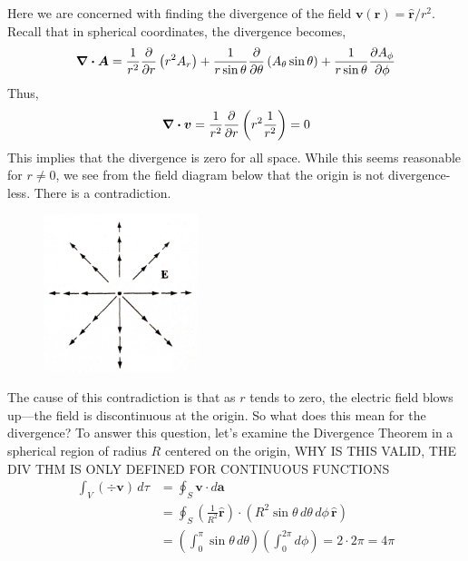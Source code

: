 \documentclass[12pt]{report}
\numberwithin{equation}{section}
\begin{document}
	Here we are concerned with finding the divergence of the field $ \boldsymbol{v}(\boldsymbol{r}) = \boldsymbol{\hat{r}}/r^2$. Recall that in spherical coordinates, the divergence becomes,
	\begin{equation}
		\div \boldsymbol{A} = \frac{1}{r^2}\pdv{}{r}\left(r^2A_r\right) + \frac{1}{r\sin\theta}\pdv{}{\theta}\left(A_\theta\sin\theta\right) + \frac{1}{r\sin\theta}\pdv{A_\phi}{\phi}
	\end{equation}
	Thus,
	\begin{equation}
		\div \boldsymbol{v} = \frac{1}{r^2}\pdv{}{r}\left(r^2 \frac{1}{r^2}\right) = 0
	\end{equation}
	This implies that the divergence is zero for all space. While this seems reasonable for $ r\neq 0 $, we see from the field diagram below that the origin is not divergence-less. There is a contradiction.
	\begin{figure}[H]
		\centering
		\includegraphics[width=4.5cm] {img/e_field}
	\end{figure}
	
	The cause of this contradiction is that as $ r $ tends to zero, the electric field blows up---the field is discontinuous at the origin. So what does this mean for the divergence? To answer this question, let's examine the Divergence Theorem in a spherical region of radius $ R $ centered on the origin, {\color{red}\uppercase{why is this valid, the div thm is only defined for continuous functions}}
	\begin{align}
		\int_V \left(\div \boldsymbol{v}\right)\,d\tau &= \oint_S \boldsymbol{v}\cdot d\boldsymbol{a}\\
		&= \oint_S \left(\frac{1}{R^2}\boldsymbol{\hat{r}}\right)\cdot\left(R^2\sin\theta\,d\theta\, d\phi \,\boldsymbol{\hat{r}}\right)\\
		&= \left(\int_0^\pi \sin\theta\,d\theta\right)\left(\int_0^{2\pi} d\phi\right) = 2\cdot 2\pi = 4\pi
	\end{align}
	
\end{document}
